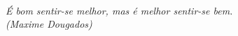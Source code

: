 

\

\vfill

\begin{flushright}
\hfill \textit{É bom sentir-se melhor, mas é melhor sentir-se bem.\\ 
(Maxime Dougados)}
\end{flushright}

\vspace*{1cm}

\clearpage